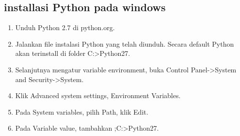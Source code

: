 \subsection{installasi Python pada windows}
	\begin{enumerate}
	\item Unduh Python 2.7 di python.org.
	\item Jalankan file instalasi Python yang telah diunduh. Secara default Python akan terinstall di folder C:>Python27.
	\item Selanjutnya mengatur variable environment, buka Control Panel->System and Security->System.
	\item Klik Advanced system settings, Environment Variables.
	\item Pada System variables, pilih Path, klik Edit.
	\item Pada Variable value, tambahkan ;C:>Python27.
	\end{enumerate}
	
